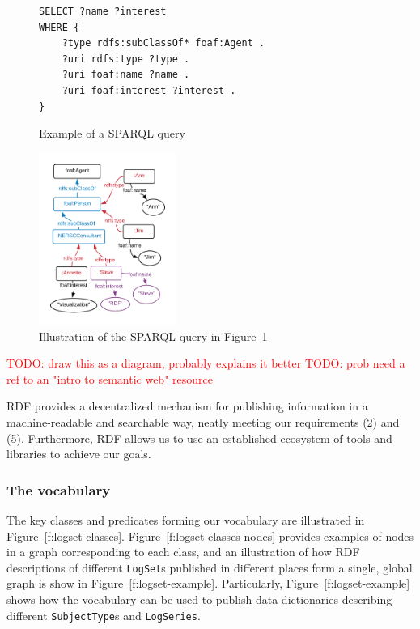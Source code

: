 \begin{figure}[H]
\begin{verbatim}
SELECT ?name ?interest 
WHERE {    
    ?type rdfs:subClassOf* foaf:Agent .
    ?uri rdfs:type ?type .
    ?uri foaf:name ?name .
    ?uri foaf:interest ?interest .
}
\end{verbatim}
\caption{Example of a SPARQL query}
\label{f:sparql}
\end{figure}


\begin{figure}
\includegraphics[width=0.4\textwidth]{sparql.png}
\caption{Illustration of the SPARQL query in Figure~\ref{f:sparql} }
\label{f:sparql-diagram}
\end{figure}

\textcolor{red}{TODO: draw this as a diagram, probably explains it better}
\textcolor{red}{TODO: prob need a ref to an "intro to semantic web" resource}

RDF provides a decentralized mechanism for publishing information in a
machine-readable and searchable way, neatly meeting our requirements
(2) and (5). Furthermore, RDF allows us to use an established ecosystem of 
tools and libraries to achieve our goals.

\subsubsection{The vocabulary}

The key classes and predicates forming our vocabulary are illustrated in 
Figure~\ref{f:logset-classes}. Figure~\ref{f:logset-classes-nodes} provides 
examples of nodes in a graph corresponding to each class, and an 
illustration of how RDF descriptions of different \texttt{LogSet}s published 
in different places form a single, global graph is show in 
Figure~\ref{f:logset-example}. Particularly, Figure~\ref{f:logset-example}
shows how the vocabulary can be used to publish data dictionaries 
describing different \texttt{SubjectType}s and \texttt{LogSeries}.

